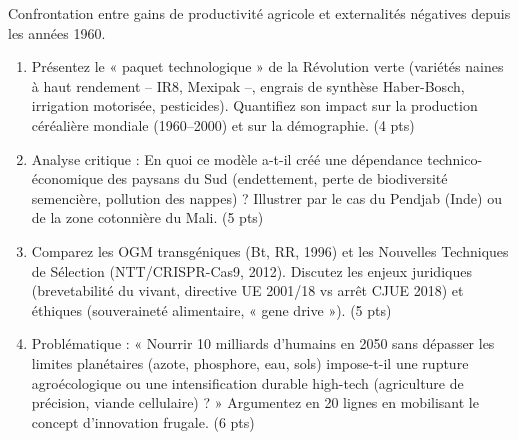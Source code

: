 \documentclass[11pt]{article}
\begin{document}
\begin{exercice}
Confrontation entre gains de productivité agricole et externalités négatives depuis les années 1960.
\begin{enumerate}
    \item Présentez le « paquet technologique » de la Révolution verte (variétés naines à haut rendement -- IR8, Mexipak --, engrais de synthèse Haber-Bosch, irrigation motorisée, pesticides). Quantifiez son impact sur la production céréalière mondiale (1960--2000) et sur la démographie. \hfill (4 pts)
    \item Analyse critique : En quoi ce modèle a-t-il créé une dépendance technico-économique des paysans du Sud (endettement, perte de biodiversité semencière, pollution des nappes) ? Illustrer par le cas du Pendjab (Inde) ou de la zone cotonnière du Mali. \hfill (5 pts)
    \item Comparez les OGM transgéniques (Bt, RR, 1996) et les Nouvelles Techniques de Sélection (NTT/CRISPR-Cas9, 2012). Discutez les enjeux juridiques (brevetabilité du vivant, directive UE 2001/18 vs arrêt CJUE 2018) et éthiques (souveraineté alimentaire, « gene drive »). \hfill (5 pts)
    \item Problématique : « Nourrir 10 milliards d'humains en 2050 sans dépasser les limites planétaires (azote, phosphore, eau, sols) impose-t-il une rupture agroécologique ou une intensification durable high-tech (agriculture de précision, viande cellulaire) ? » Argumentez en 20 lignes en mobilisant le concept d'innovation frugale. \hfill (6 pts)
\end{enumerate}
\end{exercice}
\end{document}
